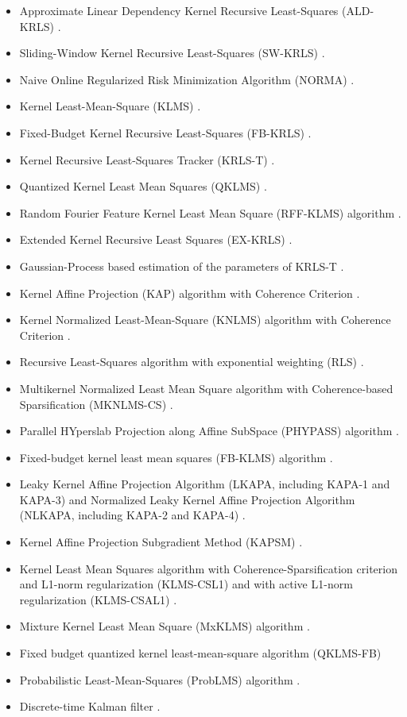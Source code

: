 \documentclass[]{report}
\begin{document}
\begin{itemize}
\item Approximate Linear Dependency Kernel Recursive Least-Squares (ALD-KRLS) \cite{engel2004kernel}.
\item Sliding-Window Kernel Recursive Least-Squares (SW-KRLS) \cite{vanvaerenbergh2006sliding}.
\item Naive Online Regularized Risk Minimization Algorithm (NORMA) \cite{kivinen2004online}.
\item Kernel Least-Mean-Square (KLMS) \cite{liu2008kernel}.
\item Fixed-Budget Kernel Recursive Least-Squares (FB-KRLS) \cite{vanvaerenbergh2010fixed}.
\item Kernel Recursive Least-Squares Tracker (KRLS-T) \cite{vanvaerenbergh2012kernel}.
\item Quantized Kernel Least Mean Squares (QKLMS) \cite{chen2012quantized}.
\item Random Fourier Feature Kernel Least Mean Square (RFF-KLMS) algorithm \cite{singh2012random}.
\item Extended Kernel Recursive Least Squares (EX-KRLS) \cite{liu2009extended}.
\item Gaussian-Process based estimation of the parameters of KRLS-T \cite{vanvaerenbergh2012estimation}.
\item Kernel Affine Projection (KAP) algorithm with Coherence Criterion \cite{richard2009online}.
\item Kernel Normalized Least-Mean-Square (KNLMS) algorithm with Coherence Criterion \cite{richard2009online}.
\item Recursive Least-Squares algorithm with exponential weighting (RLS) \cite{sayed2003fundamentals}.
\item Multikernel Normalized Least Mean Square algorithm with Coherence-based Sparsification (MKNLMS-CS) \cite{yukawa2012multikernel}.
\item Parallel HYperslab Projection along Affine SubSpace (PHYPASS) algorithm \cite{takizawa2013efficient}.
\item Fixed-budget kernel least mean squares (FB-KLMS) algorithm \cite{rzepka2012fixed}.
\item Leaky Kernel Affine Projection Algorithm (LKAPA, including KAPA-1 and KAPA-3) and Normalized Leaky Kernel Affine Projection Algorithm (NLKAPA, including KAPA-2 and KAPA-4) \cite{liu2008kernel}.
\item Kernel Affine Projection Subgradient Method (KAPSM) \cite{slavakis2008online}.
\item Kernel Least Mean Squares algorithm with Coherence-Sparsification criterion and L1-norm regularization (KLMS-CSL1) and with active L1-norm regularization (KLMS-CSAL1) \cite{gao2013kernel}.
\item Mixture Kernel Least Mean Square (MxKLMS) algorithm \cite{pokharel2013mixture}.
\item Fixed budget quantized kernel least-mean-square algorithm (QKLMS-FB) \cite{zhao2013fixed}
\item Probabilistic Least-Mean-Squares (ProbLMS) algorithm \cite{fernandez2015probabilistic}.
\item Discrete-time Kalman filter \cite{kalman1960new}.


\end{itemize}
\end{document}
